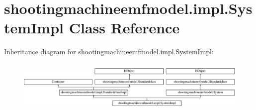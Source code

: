 \hypertarget{classshootingmachineemfmodel_1_1impl_1_1_system_impl}{\section{shootingmachineemfmodel.\-impl.\-System\-Impl Class Reference}
\label{classshootingmachineemfmodel_1_1impl_1_1_system_impl}
}
Inheritance diagram for shootingmachineemfmodel.\-impl.\-System\-Impl\-:\begin{figure}[H]
\begin{center}
\leavevmode
\includegraphics[height=2.497213cm]{classshootingmachineemfmodel_1_1impl_1_1_system_impl}
\end{center}
\end{figure}
